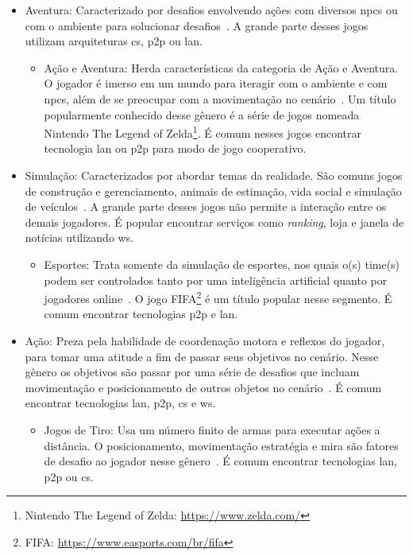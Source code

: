 \begin{itemize}
\begin{itemize}
    \end{itemize}
  \item Aventura: Caracterizado por desafios envolvendo ações com diversos \ac{npcs} ou com o ambiente para solucionar desafios~\cite{adams_1208533}. A grande parte desses jogos utilizam arquiteturas \ac{cs}, \ac{p2p} ou \ac{lan}.
    \begin{itemize}
      \item Ação e Aventura: Herda características da categoria de Ação e Aventura. O jogador é imerso em um mundo para iteragir com o ambiente e com \ac{npcs}, além de se preocupar com a movimentação no cenário~\cite{adams_1208533}. Um título popularmente conhecido desse gênero é a série de jogos nomeada Nintendo The Legend of Zelda\footnote{Nintendo The Legend of Zelda: \url{https://www.zelda.com/}}. É comum nesses jogos encontrar tecnologia \ac{lan} ou \ac{p2p} para modo de jogo cooperativo.
    \end{itemize}
  \item Simulação: Caracterizados por abordar temas da realidade. São comuns jogos de construção e gerenciamento, animais de estimação, vida social e simulação de veículos~\cite{adams_1208533}. A grande parte desses jogos não permite a interação entre os demais jogadores. É popular encontrar serviços como \textit{ranking}, loja e janela de notícias utilizando \ac{ws}.
    \begin{itemize}
      \item Esportes: Trata somente da simulação de esportes, nos quais o(s) time(s) podem ser controlados tanto por uma inteligência artificial quanto por jogadores online~\cite{adams_1208533}. O jogo FIFA\footnote{FIFA: \url{https://www.easports.com/br/fifa}} é um título popular nesse segmento. É comum encontrar tecnologias \ac{p2p} e \ac{lan}.
    \end{itemize}
  \item Ação: Preza pela habilidade de coordenação motora e reflexos do jogador, para tomar uma atitude a fim de passar seus objetivos no cenário. Nesse gênero os objetivos são passar por uma série de desafios que incluam movimentação e posicionamento de outros objetos no cenário~\cite{adams_1208533}. É comum encontrar tecnologias \ac{lan}, \ac{p2p}, \ac{cs} e \ac{ws}.
    \begin{itemize}
      \item Jogos de Tiro: Usa um número finito de armas para executar ações a distância. O posicionamento, movimentação estratégia e mira são fatores de desafio ao jogador nesse gênero~\cite{adams_1208533}. É comum encontrar tecnologias \ac{lan}, \ac{p2p} ou \ac{cs}.

\end{itemize}
\end{itemize}
